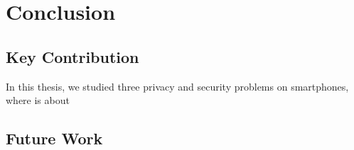 \chapter{Conclusion}\label{chap:concl}
\section{Key Contribution}
In this thesis, we studied three privacy and security problems on smartphones, where {\spp} is about  

\section{Future Work}


